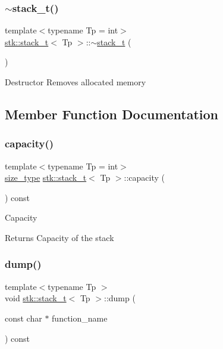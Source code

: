 \subsubsection{\texorpdfstring{$\sim$stack\+\_\+t()}{~stack\_t()}}
{\footnotesize\ttfamily template$<$typename Tp = int$>$ \\
\hyperlink{classstk_1_1stack__t}{stk\+::stack\+\_\+t}$<$ Tp $>$\+::$\sim$\hyperlink{classstk_1_1stack__t}{stack\+\_\+t} (\begin{DoxyParamCaption}{ }\end{DoxyParamCaption})\hspace{0.3cm}{\ttfamily [inline]}}

Destructor Removes allocated memory 

\subsection{Member Function Documentation}
\mbox{\label{classstk_1_1stack__t_a04b3af82e2cf60df75bf3b8507c5de9a}} 
\subsubsection{\texorpdfstring{capacity()}{capacity()}}
{\footnotesize\ttfamily template$<$typename Tp = int$>$ \\
\hyperlink{classstk_1_1stack__t_a591d5ffc540c9f27e5618f9aa4d67cad}{size\+\_\+type} \hyperlink{classstk_1_1stack__t}{stk\+::stack\+\_\+t}$<$ Tp $>$\+::capacity (\begin{DoxyParamCaption}{ }\end{DoxyParamCaption}) const\hspace{0.3cm}{\ttfamily [inline]}}

Capacity \begin{DoxyReturn}{Returns}
Capacity of the stack 
\end{DoxyReturn}
\mbox{\label{classstk_1_1stack__t_a5b880836e779c81052eb82e7f435ab54}} 
\subsubsection{\texorpdfstring{dump()}{dump()}}
{\footnotesize\ttfamily template$<$typename Tp $>$ \\
void \hyperlink{classstk_1_1stack__t}{stk\+::stack\+\_\+t}$<$ Tp $>$\+::dump (\begin{DoxyParamCaption}\item[{const char $\ast$}]{function\+\_\+name }\end{DoxyParamCaption}) const\hspace{0.3cm}{\ttfamily [private]}}

